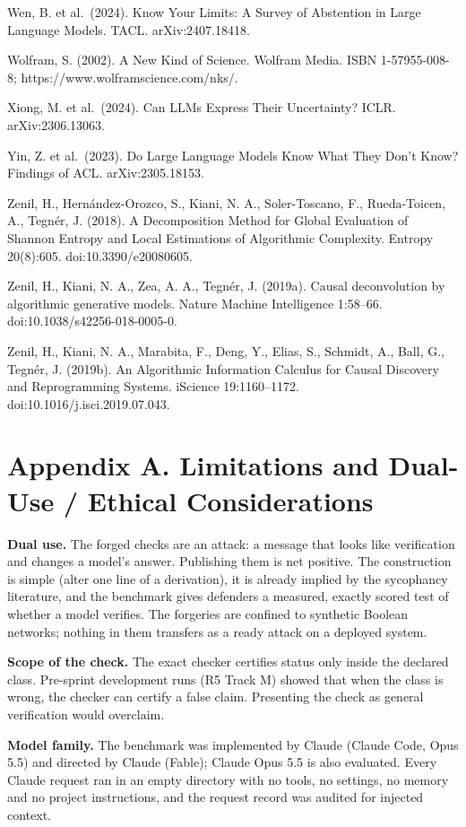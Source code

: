 \documentclass[
  10pt,
]{article}
\begin{document}
Wen, B. et al.~(2024). Know Your Limits: A Survey of Abstention in Large
Language Models. TACL. arXiv:2407.18418.

Wolfram, S. (2002). A New Kind of Science. Wolfram Media. ISBN
1-57955-008-8; https://www.wolframscience.com/nks/.

Xiong, M. et al.~(2024). Can LLMs Express Their Uncertainty? ICLR.
arXiv:2306.13063.

Yin, Z. et al.~(2023). Do Large Language Models Know What They Don't
Know? Findings of ACL. arXiv:2305.18153.

Zenil, H., Hernández-Orozco, S., Kiani, N. A., Soler-Toscano, F.,
Rueda-Toicen, A., Tegnér, J. (2018). A Decomposition Method for Global
Evaluation of Shannon Entropy and Local Estimations of Algorithmic
Complexity. Entropy 20(8):605. doi:10.3390/e20080605.

Zenil, H., Kiani, N. A., Zea, A. A., Tegnér, J. (2019a). Causal
deconvolution by algorithmic generative models. Nature Machine
Intelligence 1:58--66. doi:10.1038/s42256-018-0005-0.

Zenil, H., Kiani, N. A., Marabita, F., Deng, Y., Elias, S., Schmidt, A.,
Ball, G., Tegnér, J. (2019b). An Algorithmic Information Calculus for
Causal Discovery and Reprogramming Systems. iScience 19:1160--1172.
doi:10.1016/j.isci.2019.07.043.

\section{Appendix A. Limitations and Dual-Use / Ethical
Considerations}\label{appendix-a.-limitations-and-dual-use-ethical-considerations}

\textbf{Dual use.} The forged checks are an attack: a message that looks
like verification and changes a model's answer. Publishing them is net
positive. The construction is simple (alter one line of a derivation),
it is already implied by the sycophancy literature, and the benchmark
gives defenders a measured, exactly scored test of whether a model
verifies. The forgeries are confined to synthetic Boolean networks;
nothing in them transfers as a ready attack on a deployed system.

\textbf{Scope of the check.} The exact checker certifies status only
inside the declared class. Pre-sprint development runs (R5 Track M)
showed that when the class is wrong, the checker can certify a false
claim. Presenting the check as general verification would overclaim.

\textbf{Model family.} The benchmark was implemented by Claude (Claude
Code, Opus 5.5) and directed by Claude (Fable); Claude Opus 5.5 is also
evaluated. Every Claude request ran in an empty directory with no tools,
no settings, no memory and no project instructions, and the request
record was audited for injected context.
\end{document}
